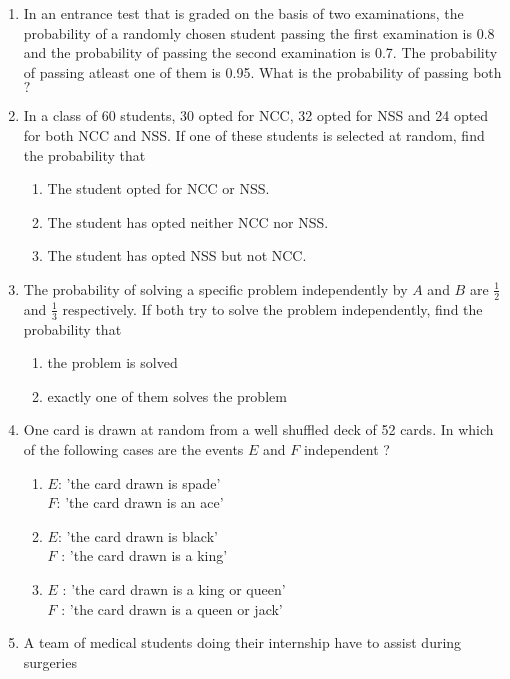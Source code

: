 \begin{enumerate}[label=\thesubsection.\arabic*,ref=\thesubsection.\theenumi]
	\solution

\item In an entrance test that is graded on the basis of two examinations, the probability of a randomly chosen student passing the first examination is 0.8 and the probability of passing the second examination is 0.7. The probability of passing atleast one of them is 0.95. What is the probability of passing both$?$
	\\
	\solution

 \item In a class of 60 students, 30 opted for NCC, 32 opted for NSS and 24 
    opted for both NCC and NSS. If one of these students is selected at random, 
    find the probability that
    \begin{enumerate}
        \item The student opted for NCC or NSS.
        \item The student has opted neither NCC nor NSS.
        \item The student has opted NSS but not NCC.
    \end{enumerate}
	\solution

\item The probability of solving a specific problem independently by $A$ and $B$ are $\frac{1}{2}$ and $\frac{1}{3}$ respectively. If both try to solve the problem independently, find the probability that
		\label{ncert/12/13/2/13}
\begin{enumerate}
\item the problem is solved
\item exactly one of them solves the problem
\end{enumerate}
\solution

\item One card is drawn at random from a well shuffled deck of 52 cards. In which of the following cases are the events $E$ and $F$ independent ?
		\label{ncert/12/13/2/14}
\begin{enumerate}
\item $E$: 'the card drawn is spade'\\
$F$: 'the card drawn is an ace'
\item $E$: 'the card drawn is black’\\
$F$ : 'the card drawn is a king’
\item $E$ : 'the card drawn is a king or queen’\\
$F$ : 'the card drawn is a queen or jack’
\end{enumerate}
\solution

	\item A team of medical students doing their internship have to assist during surgeries

\end{enumerate}
